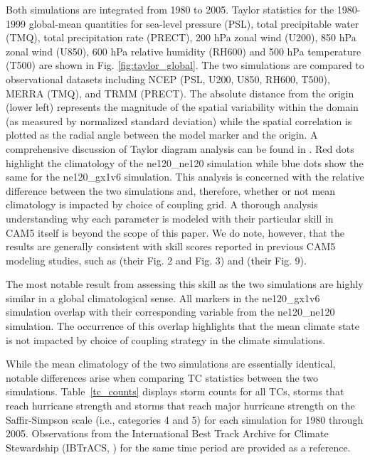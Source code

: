 \documentclass[draft,ms]{AGUTeX}
\begin{document}
\begin{article}
Both simulations are integrated from 1980 to 2005. Taylor statistics for the 1980-1999 global-mean quantities for sea-level pressure (PSL), total precipitable water (TMQ), total precipitation rate (PRECT), 200 hPa zonal wind (U200), 850 hPa zonal wind (U850), 600 hPa relative humidity (RH600) and 500 hPa temperature (T500) are shown in Fig. \ref{fig:taylor_global}. The two simulations are compared to observational datasets including NCEP \citep{Kalnay1996} (PSL, U200, U850, RH600, T500), MERRA \citep{Rienecker2011} (TMQ), and TRMM \citep{TRMM3B43} (PRECT). The absolute distance from the origin (lower left) represents the magnitude of the spatial variability within the domain (as measured by normalized standard deviation) while the spatial correlation is plotted as the radial angle between the model marker and the origin. A comprehensive discussion of Taylor diagram analysis can be found in \citet{Taylor2001}. Red dots highlight the climatology of the ne120\_ne120 simulation while blue dots show the same for the ne120\_gx1v6 simulation. This analysis is  concerned with the relative difference between the two simulations and, therefore, whether or not mean climatology is impacted by choice of coupling grid. A thorough analysis understanding why each parameter is modeled with their particular skill in CAM5 itself is beyond the scope of this paper. We do note, however, that the results are generally consistent with skill scores reported in previous CAM5 modeling studies, such as \citet{Bacmeister2014} (their Fig. 2 and Fig. 3) and \citet{Zarzycki2015AMIP} (their Fig. 9).

The most notable result from assessing this skill as the two simulations are highly similar in a global climatological sense. All markers in the ne120\_gx1v6 simulation overlap with their corresponding variable from the ne120\_ne120 simulation. The occurrence of this overlap highlights that the mean climate state is not impacted by choice of coupling strategy in the climate simulations.


While the mean climatology of the two simulations are essentially identical, notable differences arise when comparing TC statistics between the two simulations.  Table~\ref{tc_counts} displays storm counts for all TCs, storms that reach hurricane strength and storms that reach major hurricane strength on the Saffir-Simpson scale \citep{Simpson1974} (i.e., categories 4 and 5) for each simulation for 1980 through 2005. Observations from the International Best Track Archive for Climate Stewardship (IBTrACS, \citet{Knapp2010}) for the same time period are provided as a reference.


\end{article}
\end{document}
